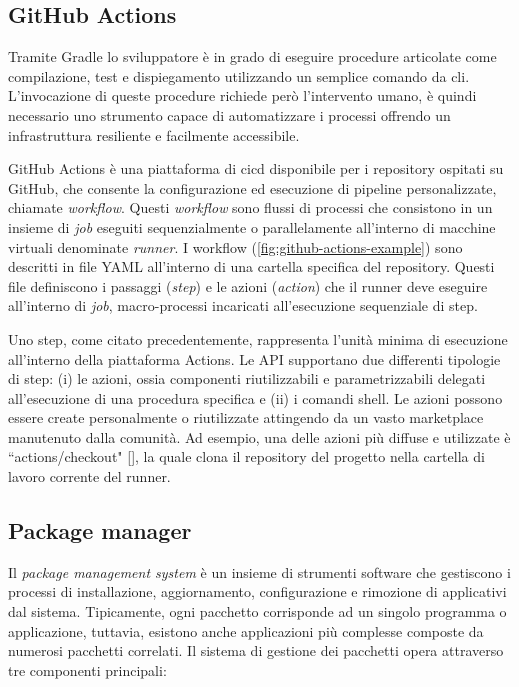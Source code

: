 \subsection{GitHub Actions}

Tramite Gradle lo sviluppatore è in grado di eseguire procedure articolate come compilazione, test e dispiegamento utilizzando un semplice comando da \ac{cli}. L'invocazione di queste procedure richiede però l'intervento umano, è quindi necessario uno strumento capace di automatizzare i processi offrendo un infrastruttura resiliente e facilmente accessibile.

GitHub Actions è una piattaforma di \ac{cicd} disponibile per i repository ospitati su GitHub, che consente la configurazione ed esecuzione di pipeline personalizzate, chiamate \textit{workflow}. Questi \textit{workflow} sono flussi di processi che consistono in un insieme di \textit{job} eseguiti sequenzialmente o parallelamente all'interno di macchine virtuali denominate \textit{runner}. I workflow (\cref{fig:github-actions-example}) sono descritti in file YAML all'interno di una cartella specifica del repository. Questi file definiscono i passaggi (\textit{step}) e le azioni (\textit{action}) che il runner deve eseguire all'interno di \textit{job}, macro-processi incaricati all'esecuzione sequenziale di step.


Uno step, come citato precedentemente, rappresenta l'unità minima di esecuzione all'interno della piattaforma Actions. Le API supportano due differenti tipologie di step: (i) le azioni, ossia componenti riutilizzabili e parametrizzabili delegati all'esecuzione di una procedura specifica e (ii) i comandi shell. Le azioni possono essere create personalmente o riutilizzate attingendo da un vasto marketplace manutenuto dalla comunità.  Ad esempio, una delle azioni più diffuse e utilizzate è ``actions/checkout" [\cite{github-actions-diffusion}], la quale clona il repository del progetto nella cartella di lavoro corrente del runner.

\subsection{Package manager}

Il \textit{package management system} è un insieme di strumenti software che gestiscono i processi di installazione, aggiornamento, configurazione e rimozione di applicativi dal sistema. Tipicamente, ogni pacchetto corrisponde ad un singolo programma o applicazione, tuttavia, esistono anche applicazioni più complesse composte da numerosi pacchetti correlati. Il sistema di gestione dei pacchetti opera attraverso tre componenti principali:

